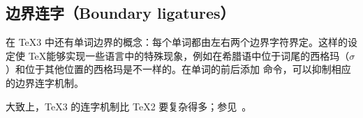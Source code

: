 \documentclass{book}
\begin{document}
\subsection{边界连字（Boundary ligatures）}

在 \TeX3 中还有单词边界的概念：每个单词都由左右两个边界字符界定。这样的设定使 \TeX 能够实现一些语言中的特殊现象，例如在希腊语中位于词尾的西格玛（$\sigma$）和位于其他位置的西格玛是不一样的。在单词的前后添加  命令，可以抑制相应的边界连字机制。

大致上，\TeX 3 的连字机制比 \TeX 2 要复杂得多；参见~\cite{K:TeX23}。

\endofchapter
\end{document}
